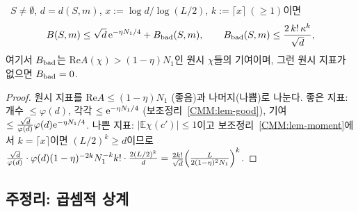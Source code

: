 \begin{proposition}[$B(S,m)$의 상계]\label{CMM:prop-B}
\PROVED\ $S\ne\emptyset$, $d=d(S,m)$, $x:=\log d/\log(L/2)$, $k:=\lceil x\rceil\ (\ge1)$이면
\[
B(S,m)\le\sqrt d\,\mathrm{e}^{-\eta N_1/4}+B_{\rm bad}(S,m),\qquad B_{\rm bad}(S,m)\le\frac{2\,k!\,\kappa^k}{\sqrt d},
\]
여기서 $B_{\rm bad}$는 $\mathrm{Re}A(\chi)>(1-\eta)N_1$인 원시 $\chi$들의 기여이며, 그런 원시 지표가 없으면 $B_{\rm bad}=0$.
\end{proposition}
\begin{proof}
원시 지표를 $\mathrm{Re}A\le(1-\eta)N_1$ (좋음)과 나머지(나쁨)로 나눈다. 좋은 지표: 개수 $\le\varphi(d)$, 각각 $\le\mathrm{e}^{-\eta N_1/4}$
(보조정리~\ref{CMM:lem-good}), 기여 $\le\frac{\sqrt d}{\varphi(d)}\varphi(d)\mathrm{e}^{-\eta N_1/4}$. 나쁜 지표: $|\mathbb E\chi(c')|\le1$이고
보조정리~\ref{CMM:lem-moment}에서 $k=\lceil x\rceil$이면 $(L/2)^k\ge d$이므로
$\frac{\sqrt d}{\varphi(d)}\cdot\varphi(d)(1-\eta)^{-2k}N_1^{-k}k!\cdot\frac{2(L/2)^k}{d}=\frac{2k!}{\sqrt d}\Bigl(\frac{L}{2(1-\eta)^2N_1}\Bigr)^k$.
\end{proof}

\subsection{주정리: 곱셈적 상계}\label{CMM:ssec-main}

